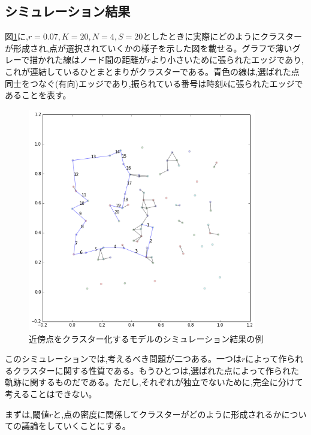 \subsection{シミュレーション結果}
図\ref{fig:f15}に,$r=0.07, K=20, N=4, S=20$としたときに実際にどのようにクラスターが形成され,点が選択されていくかの様子を示した図を載せる。グラフで薄いグレーで描かれた線はノード間の距離が$r$より小さいために張られたエッジであり,これが連結しているひとまとまりがクラスターである。青色の線は,選ばれた点同士をつなぐ(有向)エッジであり,振られている番号は時刻$k$に張られたエッジであることを表す。
\begin{figure}[H]
    \begin{center}
        \includegraphics[width=10cm]{../img/cluster.png}
        \caption{近傍点をクラスター化するモデルのシミュレーション結果の例}
        \label{fig:f15}
    \end{center}
\end{figure}

このシミュレーションでは,考えるべき問題が二つある。一つは$r$によって作られるクラスターに関する性質である。もうひとつは,選ばれた点によって作られた軌跡に関するものだである。ただし,それぞれが独立でないために,完全に分けて考えることはできない。

まずは,閾値$r$と,点の密度に関係してクラスターがどのように形成されるかについての議論をしていくことにする。

